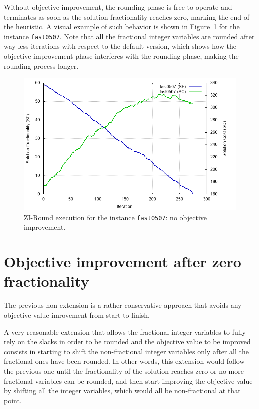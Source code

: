 \documentclass[a4paper,12pt,twoside]{scrbook}
\begin{document}
Without objective improvement, the rounding phase is free to operate and terminates as soon as the solution fractionality reaches zero, marking the end of the heuristic. A visual example of such behavior is shown in Figure~\ref{fig:exzi-noobjimprove} for the instance \texttt{fast0507}. Note that all the fractional integer variables are rounded after way less iterations with respect to the default version, which shows how the objective improvement phase interferes with the rounding phase, making the rounding process longer.
\begin{figure}[ht]
	\centering
	\includegraphics[width=\textwidth]{fast0507-noshiftnonfrac.png}
	\caption{ZI-Round execution for the instance \texttt{fast0507}: no objective improvement.}
	\label{fig:exzi-noobjimprove}
\end{figure}

\section{Objective improvement after zero fractionality}
The previous non-extension is a rather conservative approach that avoids any objective value imrovement from start to finish. \par 

A very reasonable extension that allows the fractional integer variables to fully rely on the slacks in order to be rounded and the objective value to be improved consists in starting to shift the non-fractional integer variables only after all the fractional ones have been rounded. In other words, this extension would follow the previous one until the fractionality of the solution reaches zero or no more fractional variables can be rounded, and then start improving the objective value by shifting all the integer variables, which would all be non-fractional at that point. \par
\end{document}
